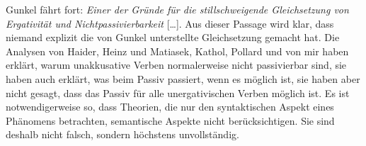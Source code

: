 Gunkel fährt fort: \emph{Einer der Gründe für die stillschweigende Gleichsetzung von Ergativität und
  Nichtpassivierbarkeit} [\ldots].
Aus dieser Passage wird klar, dass niemand explizit die von Gunkel unterstellte Gleichsetzung gemacht hat.
Die Analysen von Haider, Heinz und Matiasek, Kathol, Pollard und von mir haben erklärt, warum
unakkusative Verben normalerweise nicht 
passivierbar sind, sie haben auch erklärt, 
was beim Passiv passiert, wenn es möglich ist, sie haben aber nicht gesagt,
dass das Passiv für alle unergativischen Verben möglich ist. Es ist notwendigerweise so, dass Theorien, die nur den
syntaktischen Aspekt eines Phänomens betrachten, semantische Aspekte nicht berücksichtigen. Sie sind
deshalb nicht falsch, sondern höchstens unvollständig. 







\label{lastpage}
